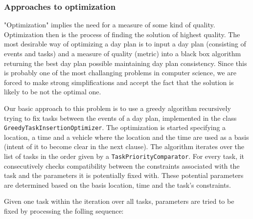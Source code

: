 \subsubsection{Approaches to optimization}
 
"Optimization" implies the need for a measure of some kind of quality. Optimization then is the process of finding the solution of highest quality. The most desirable way of optimizing a day plan is to input a day plan (consisting of events and tasks) and a measure of quality (metric) into a black box algorithm returning the best day plan possible maintaining day plan consistency. Since this is probably one of the most challanging problems in computer science, we are forced to make strong simplifications and accept the fact that the solution is likely to be not the optimal one.\newline

Our basic approach to this problem is to use a greedy algorithm recursively trying to fix tasks between the events of a day plan, implemented in the class \texttt{GreedyTaskInsertionOptimizer}. The optimization is started specifying a location, a time and a vehicle where the location and the time are used as a basis (intent of it to become clear in the next clause). The algorithm iterates over the list of tasks in the order given by a \texttt{TaskPriorityComparator}. For every task, it consecutively checks compatibility between the constraints associated with the task and the parameters it is potentially fixed with. These potential parameters are determined based on the basis location, time and the task's constraints.\newline

Given one task within the iteration over all tasks, parameters are tried to be fixed by processing the folling sequence:

